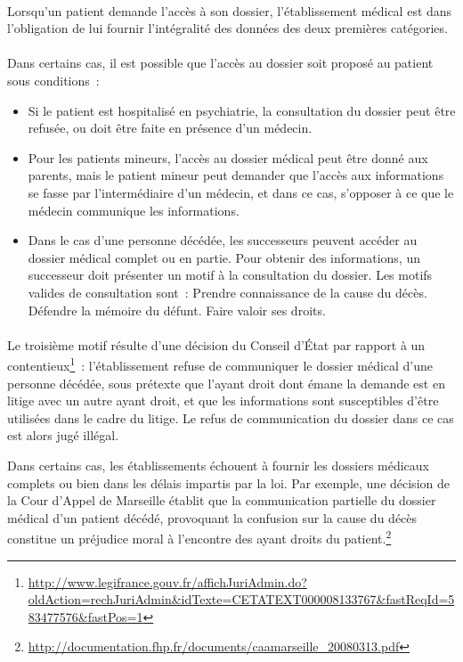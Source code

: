 \paragraph{}
Lorsqu'un patient demande l'accès à son dossier, l'établissement médical est dans l'obligation
de lui fournir l'intégralité des données des deux premières catégories.

\paragraph{}
Dans certains cas, il est possible que l'accès au dossier soit proposé au patient sous conditions~:

\begin{itemize}
    \item Si le patient est hospitalisé en psychiatrie, la consultation du
        dossier peut être refusée, ou doit être faite en présence d'un médecin.

    \item Pour les patients mineurs, l'accès au dossier médical peut être donné
        aux parents, mais le patient mineur peut demander que l'accès aux
        informations se fasse par l'intermédiaire d'un médecin, et dans ce cas,
        s'opposer à ce que le médecin communique les informations.

    \item Dans le cas d'une personne décédée, les successeurs peuvent accéder
        au dossier médical complet ou en partie. Pour obtenir des informations,
        un successeur doit présenter un motif à la consultation du dossier. Les
        motifs valides de consultation sont~:
            \subitem{\textbullet\,} Prendre connaissance de la cause du décès.
            \subitem{\textbullet\,} Défendre la mémoire du défunt.
            \subitem{\textbullet\,} Faire valoir ses droits.
\end{itemize}

\paragraph{}
Le troisième motif résulte d'une décision du Conseil d'État par rapport à un
contentieux\footnote{\url{http://www.legifrance.gouv.fr/affichJuriAdmin.do?oldAction=rechJuriAdmin&idTexte=CETATEXT000008133767&fastReqId=583477576&fastPos=1}}~:
l'établissement refuse de communiquer le dossier médical d'une personne
décédée, sous prétexte que l'ayant droit dont émane la demande est en litige
avec un autre ayant droit, et que les informations sont susceptibles d'être
utilisées dans le cadre du litige.  Le refus de communication du dossier dans
ce cas est alors jugé illégal.

Dans certains cas, les établissements échouent à fournir les dossiers médicaux
complets ou bien dans les délais impartis par la loi. Par exemple, une décision
de la Cour d'Appel de Marseille établit que la communication partielle du
dossier médical d'un patient décédé, provoquant la confusion sur la cause du
décès constitue un préjudice moral à l'encontre des ayant droits du
patient.\footnote{\url{http://documentation.fhp.fr/documents/caamarseille_20080313.pdf}}
